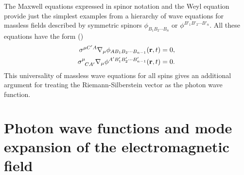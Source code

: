 \documentclass[11pt]{article}
\begin{document}
The Maxwell equations expressed in spinor notation and the Weyl equation
provide just the simplest examples from a hierarchy of wave equations for
massless fields described by symmetric spinors $\phi_{B_1 B_2 \cdots B_n}$
or $\phi^{B'_1 B'_2 \cdots B'_n}$. All these equations have the form
(\cite{PR_84})
\begin{eqnarray}
\sigma^{\mu C'A}\nabla_\mu\phi_{AB_1 B_2 \cdots B_{n-1}}({\bf r},t) = 0,\\
\sigma^\mu_{\;\;CA'}\nabla_\mu\phi^{A'B'_1 B'_2 \cdots B'_{n-1}}({\bf r},t)
 = 0.
\end{eqnarray}
This universality of massless wave equations for all spins gives an
additional argument for treating the Riemann-Silberstein vector as the
photon wave function.

\section[WAVE FUNCTIONS AND MODE EXPANSION]{Photon wave functions and mode
expansion of the electromagnetic field\label{mode}}
\end{document}
